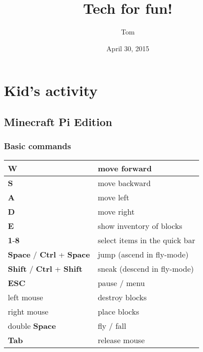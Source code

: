 \documentclass[letterpaper,10pt,english]{sphinxmanual}
\title{Tech for fun!}
\date{April 30, 2015}
\author{Tom}
\begin{document}
\maketitle
\tableofcontents
{}\label{index::doc}



\chapter{Kid's activity}
\label{index:kid-s-activity}\label{index:tech-for-fun}

\section{Minecraft Pi Edition}
\label{kid/minecraft::doc}\label{kid/minecraft:minecraft-pi-edition}

\subsection{Basic commands}
\label{kid/minecraft:basic-commands}
\begin{tabulary}{\linewidth}{|L|L|}
\hline

\textbf{W}
 & 
move forward
\\
\hline
\textbf{S}
 & 
move backward
\\
\hline
\textbf{A}
 & 
move left
\\
\hline
\textbf{D}
 & 
move right
\\
\hline
\textbf{E}
 & 
show inventory of blocks
\\
\hline
\textbf{1}-\textbf{8}
 & 
select items in the quick bar
\\
\hline
\textbf{Space} / \textbf{Ctrl} + \textbf{Space}
 & 
jump (ascend in fly-mode)
\\
\hline
\textbf{Shift} / \textbf{Ctrl} + \textbf{Shift}
 & 
sneak (descend in fly-mode)
\\
\hline
\textbf{ESC}
 & 
pause / menu
\\
\hline
left mouse
 & 
destroy blocks
\\
\hline
right mouse
 & 
place blocks
\\
\hline
double \textbf{Space}
 & 
fly / fall
\\
\hline
\textbf{Tab}
 & 
release mouse
\\
\hline\end{tabulary}
\end{document}
